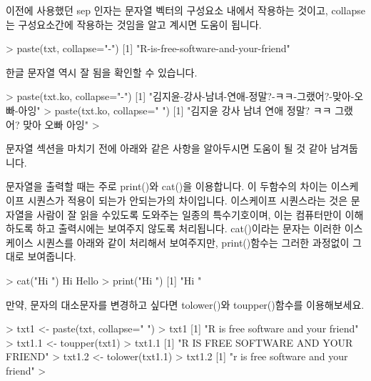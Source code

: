 \documentclass[tutorial.tex]{subfiles}
\begin{document}
이전에 사용했던 sep 인자는 문자열 벡터의 구성요소 내에서 작용하는 것이고, collapse는 구성요소간에 작용하는 것임을 알고 계시면 도움이 됩니다.  

\begin{Schunk}
\begin{Soutput} 
> paste(txt, collapse="-")
[1] "R-is-free-software-and-your-friend"
\end{Soutput}
\end{Schunk}

한글 문자열 역시 잘 됨을 확인할 수 있습니다. 

\begin{Schunk}
\begin{Soutput} 
> paste(txt.ko, collapse="-")
[1] "김지윤-강사-남녀-연애-정말?-ㅋㅋ-그랬어?-맞아-오빠-아잉"
> paste(txt.ko, collapse=" ")
[1] "김지윤 강사 남녀 연애 정말? ㅋㅋ 그랬어? 맞아 오빠 아잉"
> 
\end{Soutput}
\end{Schunk}


문자열 섹션을 마치기 전에 아래와 같은 사항을 알아두시면 도움이 될 것 같아 남겨둡니다. 

문자열을 출력할 때는 주로 print()와 cat()을 이용합니다. 
이 두함수의 차이는 이스케이프 시퀀스가 적용이 되는가 안되는가의 차이입니다.
이스케이프 시퀀스라는 것은 문자열을 사람이 잘 읽을 수있도록 도와주는 일종의 특수기호이며, 이는 컴퓨터만이 이해하도록 하고 출력시에는 보여주지 않도록 처리됩니다. 
cat()이라는 문자는 이러한 이스케이스 시퀀스를 아래와 같이 처리해서 보여주지만, print()함수는 그러한 과정없이 그대로 보여줍니다. 

\begin{Schunk}
\begin{Soutput} 
> cat("Hi \nHello \n")
Hi 
Hello 
> print("Hi \nHello \n")
[1] "Hi \nHello \n"
\end{Soutput}
\end{Schunk}

만약, 문자의 대소문자를 변경하고 싶다면 tolower()와 toupper()함수를 이용해보세요.

\begin{Schunk}
\begin{Soutput} 
> txt1 <- paste(txt, collapse=" ")
> txt1
[1] "R is free software and your friend"
> txt1.1 <- toupper(txt1)
> txt1.1
[1] "R IS FREE SOFTWARE AND YOUR FRIEND"
> txt1.2 <- tolower(txt1.1)
> txt1.2
[1] "r is free software and your friend"
> 
\end{Soutput}
\end{Schunk}
\end{document}
